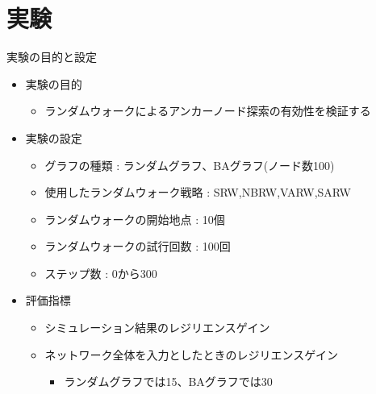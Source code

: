 \documentclass[compress,dvipdfmx,11pt]{beamer}
\begin{document}
\section{実験}
\label{sec:org7e13e3d}
\begin{frame}[label={sec:org03810a4}]{実験の目的と設定}
\begin{itemize}
  \item 実験の目的
  \begin{itemize}
    \item ランダムウォークによるアンカーノード探索の有効性を検証する
  \end{itemize}

  \item 実験の設定
  \begin{itemize}
    \item グラフの種類 : ランダムグラフ、BAグラフ(ノード数100)
    \item 使用したランダムウォーク戦略 : SRW,NBRW,VARW,SARW
    \item ランダムウォークの開始地点 : 10個
    \item ランダムウォークの試行回数 : 100回
    \item ステップ数 : 0から300
  \end{itemize}

  \item 評価指標
  \begin{itemize}
    \item シミュレーション結果のレジリエンスゲイン
    \item ネットワーク全体を入力としたときのレジリエンスゲイン
    \begin{itemize}
      \item ランダムグラフでは15、BAグラフでは30
    \end{itemize}
  \end{itemize}
\end{itemize}
\end{frame}
\end{document}
